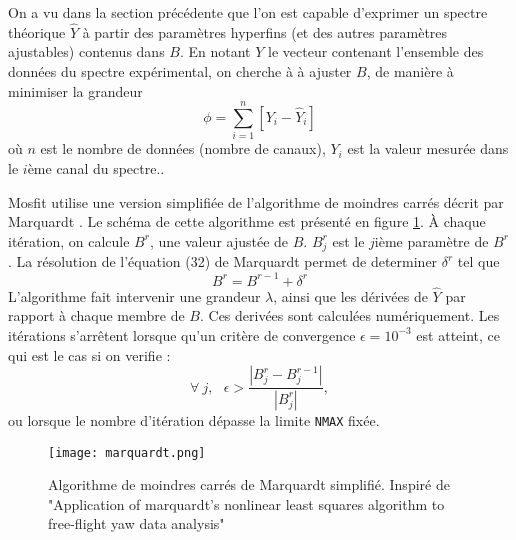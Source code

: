 On a vu dans la section précédente que l'on est capable d'exprimer un spectre théorique $\widehat{Y}$ à partir des paramètres hyperfins (et des autres paramètres ajustables) contenus dans $B$.
En notant $Y$ le vecteur contenant l'ensemble des données du spectre expérimental, on cherche à à ajuster $B$, de manière à minimiser la grandeur 
\begin{equation}
\phi = \sum^{n}_{i=1} \left[Y_i - \widehat{Y}_i\right]
\end{equation}
où $n$ est le nombre de données (nombre de canaux), $Y_i$ est la valeur mesurée dans le $i$ème canal du spectre..

Mosfit utilise une version simplifiée de l'algorithme de moindres carrés décrit par Marquardt \cite{marquardt}.
Le schéma de cette algorithme est présenté en figure \ref{fig:marquardt}.
À chaque itération, on calcule $B^r$, une valeur ajustée de $B$. $B^r_j$ est le $j$ième paramètre de $B^r$. 
 La résolution de l'équation (32) de Marquardt\cite{marquardt} permet de determiner $\delta^r$ tel que 
\begin{equation}
  B^r = B^{r-1} + \delta^r 
\end{equation}
L'algorithme fait intervenir une grandeur $\lambda$, ainsi que les dérivées de $\hat{Y}$ par rapport à chaque membre de $B$.
Ces derivées sont calculées numériquement.
Les itérations s'arrêtent lorsque qu'un critère de convergence $\epsilon=10^{-3}$ est atteint, ce qui est le cas si on verifie :
\begin{equation}
 \forall~j,~~~\epsilon > \frac{|B^r_j - B^{r-1}_j|}{|B^r_j|},
\end{equation} 
ou lorsque le nombre d'itération dépasse la limite \lstinline{NMAX} fixée.


\begin{figure}
\texttt{[image: marquardt.png]}
\caption{\label{fig:marquardt}Algorithme de moindres carrés de Marquardt simplifié. Inspiré de "Application of marquardt's nonlinear least squares
algorithm to free-flight yaw data analysis"}
\end{figure}

